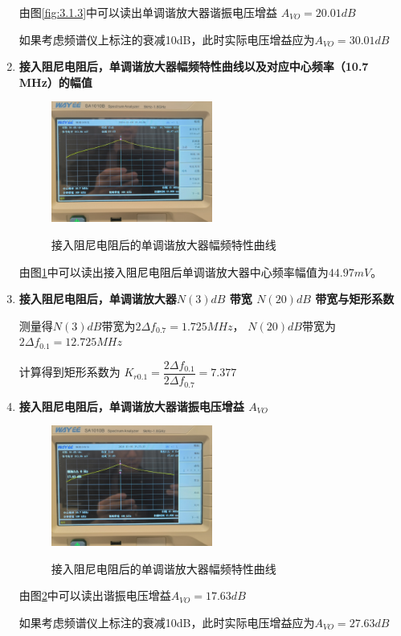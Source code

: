 \documentclass[UTF8]{ctexart}
\begin{document}
\begin{enumerate}[(1)]
    由图\ref{fig:3.1.3}中可以读出单调谐放大器谐振电压增益 $A_{VO}=20.01dB$

    如果考虑频谱仪上标注的衰减10dB，此时实际电压增益应为$A_{VO}=30.01dB$
    
    \item \noindent \textbf{接入阻尼电阻后，单调谐放大器幅频特性曲线以及对应中心频率（10.7 MHz）的幅值}    
    \begin{figure}[H]
        \centering
        \includegraphics[width=0.5\textwidth]{pics/3.1.4.png}
        ~\\
        \caption{接入阻尼电阻后的单调谐放大器幅频特性曲线}\label{fig:3.1.4}
    \end{figure}

    由图\ref{fig:3.1.4}中可以读出接入阻尼电阻后单调谐放大器中心频率幅值为$44.97mV$。
  
    \item \noindent \textbf{接入阻尼电阻后，单调谐放大器$N(3)dB$ 带宽 $N(20)dB$ 带宽与矩形系数}

    测量得$N(3)dB$带宽为$2\Delta f_{0.7}=1.725MHz$，
    $N(20)dB$带宽为$2\Delta f_{0.1}=12.725MHz$

    计算得到矩形系数为
    $K_{r0.1}=\dfrac{2\Delta f_{0.1}}{2\Delta f_{0.7}}=7.377$
    
    \item \noindent \textbf{接入阻尼电阻后，单调谐放大器谐振电压增益 $A_{VO}$}
    \begin{figure}[H]
        \centering
        \includegraphics[width=0.5\textwidth]{pics/3.1.6.png}
        ~\\
        \caption{接入阻尼电阻后的单调谐放大器幅频特性曲线}\label{fig:3.1.6}
    \end{figure}

    \vspace{-2em}
    由图\ref{fig:3.1.6}中可以读出谐振电压增益$A_{VO}=17.63dB$
    
    如果考虑频谱仪上标注的衰减10dB，此时实际电压增益应为$A_{VO}=27.63dB$    
\end{enumerate}
\end{document}
